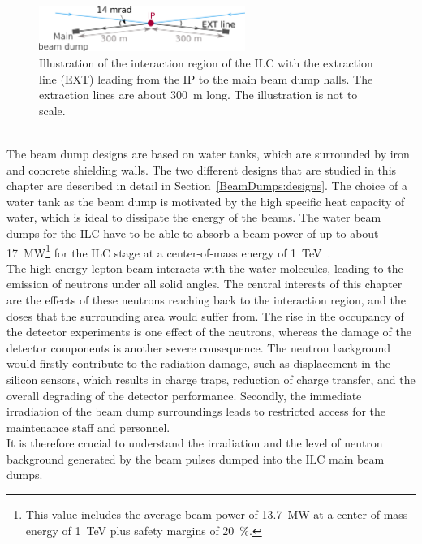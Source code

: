 \begin{figure}
\centering
\includegraphics[width=0.6\textwidth]{Figures/BeamDump/IP_EXT.png}
\caption[Schematic of the ILC interaction region with extraction line]{Illustration of the interaction region of the ILC with the extraction line (EXT) leading from the IP to the main beam dump halls.
The extraction lines are about \SI[detect-all]{300}{\meter} long.
The illustration is not to scale.}
\label{fig:BeamDumps:IP_to_Dump}
\end{figure}
\\The beam dump designs are based on water tanks, which are surrounded by iron and concrete shielding walls. 
The two different designs that are studied in this chapter are described in detail in Section~\ref{BeamDumps:designs}.
The choice of a water tank as the beam dump is motivated by the high specific heat capacity of water, which is ideal to dissipate the energy of the beams. 
The water beam dumps for the ILC have to be able to absorb a beam power of up to about \SI{17}{\mega\watt}\footnote{This value includes the average beam power of \SI{13.7}{\mega\watt} at a center-of-mass energy of \SI{1}{\TeV} plus safety margins of \SI{20}{\percent}.} for the ILC stage at a center-of-mass energy of \SI{1}{\TeV}~\cite{BeamDumpSpecs}.
\\The high energy lepton beam interacts with the water molecules, leading to the emission of neutrons under all solid angles. 
The central interests of this chapter are the effects of these neutrons reaching back to the interaction region, and the doses that the surrounding area would suffer from. 
The rise in the occupancy of the detector experiments is one effect of the neutrons, whereas the damage of the detector components is another severe consequence.
The neutron background would firstly contribute to the radiation damage, such as displacement in the silicon sensors, which results in charge traps, reduction of charge transfer, and the overall degrading of the detector performance. 
Secondly, the immediate irradiation of the beam dump surroundings leads to restricted access for the maintenance staff and personnel.
\\It is therefore crucial to understand the irradiation and the level of neutron background generated by the beam pulses dumped into the ILC main beam dumps.

